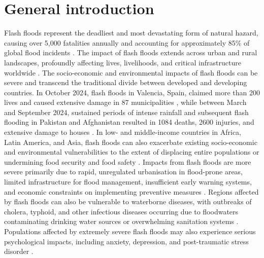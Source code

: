 \chapter{General introduction}
\label{general_introduction}
\graphicspath{{chapter_01/figures}{chapter_01/tables}}



\chapterindent Flash  floods represent the deadliest and most devastating form of natural hazard, causing over 5,000 fatalities annually and accounting for approximately 85\% of global flood incidents \citep{Dordevic_2020}. The impact of flash floods extends across urban and rural landscapes, profoundly affecting lives, livelihoods, and critical infrastructure worldwide \citep{Liu_2024a}. The socio-economic \citep{Ebi_2021} and environmental \citep{Zhang_2024a} impacts of flash floods can be severe and transcend the traditional divide between developed and developing countries. In October 2024, flash floods in Valencia, Spain, claimed more than 200 lives and caused extensive damage in 87 municipalities \citep{Grau-Bove_2024}, while between March and September 2024, sustained periods of intense rainfall and subsequent flash flooding in Pakistan and Afghanistan resulted in 1084 deaths, 2600 injuries, and extensive damage to houses \citep{Wikipedia_2025}. In low- and middle-income countries in Africa, Latin America, and Asia, flash floods can also exacerbate existing socio-economic and environmental vulnerabilities to the extent of displacing entire populations \citep{Stephens_2024} or undermining food security and food safety \citep{Agabiirwe_2022, Duchenne-Moutien_2021}. Impacts from flash floods are more severe primarily due to rapid, unregulated urbanisation in flood-prone areas, limited infrastructure for flood management, insufficient early warning systems, and economic constraints on implementing preventive measures \citep{Douglas_2017, Pinos_2022, Wang_2021b}. Regions affected by flash floods can also be vulnerable to waterborne diseases, with outbreaks of cholera, typhoid, and other infectious diseases occurring due to floodwaters contaminating drinking water sources or overwhelming sanitation systems \citep{Lee_2020}. Populations affected by extremely severe flash floods may also experience serious psychological impacts, including anxiety, depression, and post-traumatic stress disorder \citep{Iqbal_2023}. 

